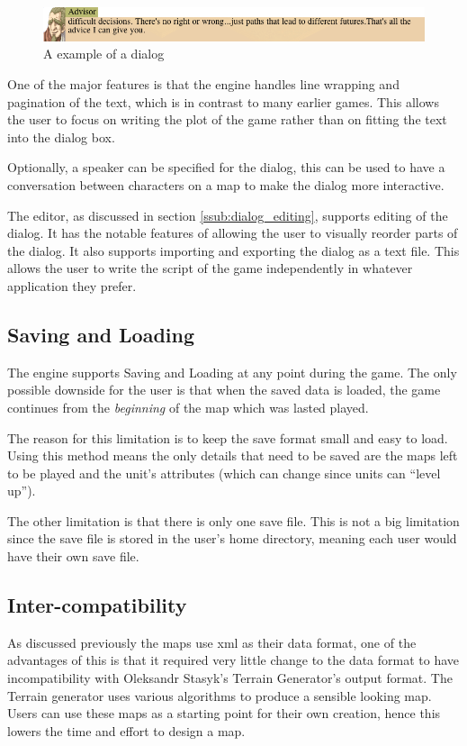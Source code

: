 \begin{figure}[htbp]
	\centering
		\includegraphics[width=6.3in]{figures/dialog2.png}
	\caption{A example of a dialog}
	\label{fig:figures_dialog2}
\end{figure}

One of the major features is that the engine handles line wrapping and pagination of the text, which is in contrast to many earlier games. This allows the user to focus on writing the plot of the game rather than on fitting the text into the dialog box. 

Optionally, a speaker can be specified for the dialog, this can be used to have a conversation between characters on a map to make the dialog more interactive. 

The editor, as discussed in section \ref{ssub:dialog_editing}, supports editing of the dialog. It has the notable features of allowing the user to visually reorder parts of the dialog. It also supports   importing and exporting the dialog as a text file.  This allows the user to write the script of the game independently in whatever application they prefer. 


\subsection{Saving and Loading}
The engine supports Saving and Loading at any point during the game. The only possible downside  for the user is that when the saved data is loaded, the game continues from the \emph{beginning} of the map which was lasted played. 

The reason for this limitation is to keep the save format small and easy to load. Using this method means the only details that need to be saved are the maps left to be played and the unit's attributes (which can change since units can ``level up''). 

The other limitation is that there is only one save file. This is not a big limitation since the  save file is stored in the user's home directory, meaning each user would have their own save file.

\subsection{Inter-compatibility}
\label{ssub:intercompatibility}
As discussed previously the maps use xml as their data format, one of the advantages of this is that it required very little change to the data format to have incompatibility with Oleksandr Stasyk's  Terrain Generator's output format.  The Terrain generator uses various algorithms to produce a sensible looking map. Users can use these maps as a starting point for their own creation, hence this lowers the time and effort to design a map.

